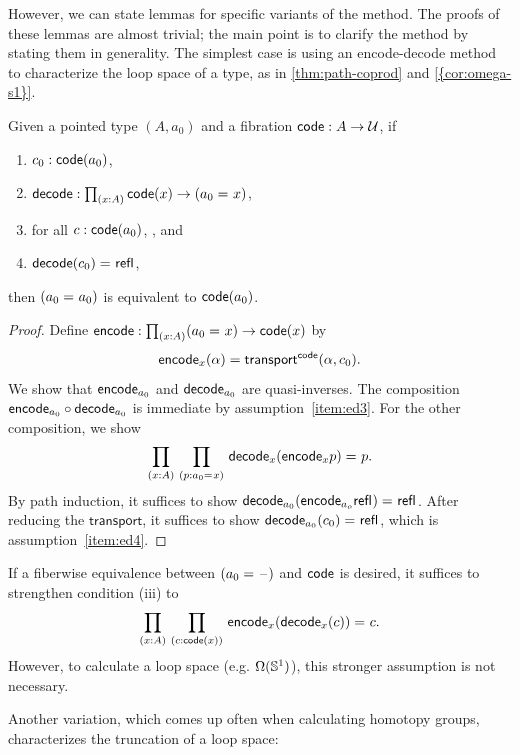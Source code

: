 However, we can state lemmas for specific variants of the method.
The proofs of these lemmas are almost trivial; the main point is to
clarify the method by stating them in generality.  The simplest
case is using an encode-decode method to characterize the loop space of a
type, as in \cref{thm:path-coprod} and \cref{{cor:omega-s1}}.

\begin{lem}\label{lem:encode-decode-loop}
Given a pointed type $(A,a_0)$ and a fibration
$\mathsf{code} : A \to \mathcal{U}$, if
\begin{enumerate}
\item $c_0 : \mathsf{code}(a_0)$,\label{item:ed1}
\item $\decode : \prd{x:A} \code(x) \to (\id{a_0}{x})$,\label{item:ed2}
\item for all $c : \mathsf{code}(a_0)$, , and\label{item:ed3}
\item $\mathsf{decode}(c_0) =_{} \mathsf{refl}_{}$,\label{item:ed4}
\end{enumerate}
then $(a_0 =_{} a_0)$ is equivalent to $\mathsf{code}(a_0)$.
\end{lem}

\begin{proof}
Define
$\encode : \prd{x:A} (\id{a_0}{x}) \to \code(x)$ by
\[
\mathsf{encode}_x(\alpha) = \mathsf{transport}^{\mathsf{code}}(\alpha,c_0).
\]
We show that $\mathsf{encode}_{a_0}$ and $\mathsf{decode}_{a_0}$ are quasi-inverses.
The composition $\mathsf{encode}_{a_0} \circ \mathsf{decode}_{a_0}$ is immediate by
assumption~\ref{item:ed3}.  For the other composition, we show
\[
\prd{x:A}{p : \id{a_0}{x}} \id{\decode_{x} (\encode_{x} p)}{p}.
\]
By path induction, it suffices to show
${\mathsf{decode}_{{a_0}} (\mathsf{encode}_{{a_o}} \mathsf{refl}_{})} =_{} \mathsf{refl}_{}$.
After reducing the $\mathsf{transport}$, it suffices to show
${\mathsf{decode}_{{a_0}} (c_0)} =_{} \mathsf{refl}_{}$, which is assumption~\ref{item:ed4}.
\end{proof}

If a fiberwise equivalence between $(a_0 =_{} \mathord{\hspace{1pt}\text{--}\hspace{1pt}})$ and $\mathsf{code}$ is desired,
it suffices to strengthen condition (iii) to
\[
\prd{x:A}{c : \code(x)} \id{\encode_{x}(\decode_{x}(c))}{c}.
\]
However, to calculate a loop space (e.g. $\Omega(\mathbb{S} ^1)$), this
stronger assumption is not necessary.

Another variation, which comes up often when calculating homotopy
groups, characterizes the truncation of a loop space:

